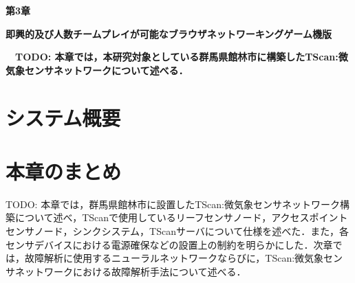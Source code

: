 \newpage
\setcounter{chapter}{3}
\setcounter{section}{0}

\begin{center}
\vspace{0.5cm}
\huge{\bf 第3章}
\par
\vspace{1cm}
\hrulefill
\par
\vspace{1cm}
\huge{\bf 即興的及び人数チームプレイが可能なブラウザネットワーキングゲーム機版}
\par
\vspace{0.5cm}
\hrulefill
\vspace{1cm}
\par

\begin{flushleft}
\large{{\bf　TODO: 本章では，本研究対象としている群馬県館林市に構築したTScan:微気象センサネットワークについて述べる．}}
\end{flushleft}
\end{center}


\newpage
\section{システム概要}

\newpage

\section{本章のまとめ}
TODO: 本章では，群馬県館林市に設置したTScan:微気象センサネットワーク構築について述べ，TScanで使用しているリーフセンサノード，アクセスポイントセンサノード，シンクシステム，TScanサーバについて仕様を述べた．また，各センサデバイスにおける電源確保などの設置上の制約を明らかにした．次章では，故障解析に使用するニューラルネットワークならびに，TScan:微気象センサネットワークにおける故障解析手法について述べる．

\newpage
